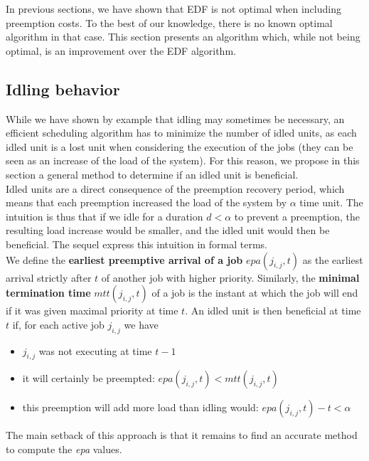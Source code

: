 \documentclass[a4paper,10pt]{article}
\begin{document}
    In previous sections, we have shown that EDF is not optimal when including preemption costs. To the best of our knowledge, there is no known optimal algorithm in that case. This section presents an algorithm which, while not being optimal, is an improvement over the EDF algorithm.

    \subsection{Idling behavior}

        While we have shown by example that idling may sometimes be necessary, an efficient scheduling algorithm has to minimize the number of idled units, as each idled unit is a lost unit when considering the execution of the jobs (they can be seen as an increase of the load of the system). For this reason, we propose in this section a general method to determine if an idled unit is beneficial.\\

        Idled units are a direct consequence of the preemption recovery period, which means that each preemption increased the load of the system by $\alpha$ time unit. The intuition is thus that if we idle for a duration $d < \alpha$ to prevent a preemption, the resulting load increase would be smaller, and the idled unit would then be beneficial. The sequel express this intuition in formal terms.\\

        We define the \textbf{earliest preemptive arrival of a job} $epa(j_{i,j}, t)$ as the earliest arrival strictly after $t$ of another job with higher priority. Similarly, the \textbf{minimal termination time } $mtt(j_{i,j}, t)$ of a job is the instant at which the job will end if it was given maximal priority at time $t$. An idled unit is then beneficial at time $t$ if, for each active job $j_{i,j}$ we have
        \begin{itemize}
            \item $j_{i,j}$ was not executing at time $t-1$
            \item it will certainly be preempted: $epa(j_{i,j}, t) < mtt(j_{i,j}, t)$
            \item this preemption will add more load than idling would: $epa(j_{i,j}, t) - t < \alpha$
        \end{itemize}

        The main setback of this approach is that it remains to find an accurate method to compute the \emph{epa} values.
\end{document}
